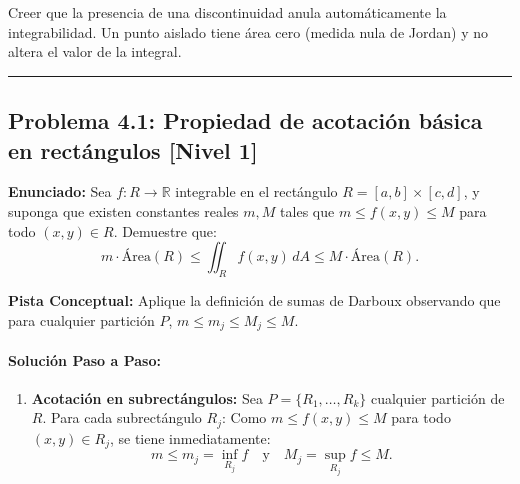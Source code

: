 \documentclass[11pt,a4paper]{article}
\begin{document}
\begin{trapbox}
Creer que la presencia de una discontinuidad anula automáticamente la integrabilidad. Un punto aislado tiene área cero (medida nula de Jordan) y no altera el valor de la integral.
\end{trapbox}

\vspace{0.5cm}
\hrule
\vspace{0.5cm}


\subsection*{Problema 4.1: Propiedad de acotación básica en rectángulos \hfill \color{primaryblue}\small[Nivel 1]}

\begin{tcolorbox}[colback=white,colframe=gray!40,arc=1mm,boxrule=0.5pt,left=3mm,right=3mm,top=2mm,bottom=2mm]
\textbf{Enunciado:} Sea $f: R \to \mathbb{R}$ integrable en el rectángulo $R = [a,b] \times [c,d]$, y suponga que existen constantes reales $m, M$ tales que $m \le f(x,y) \le M$ para todo $(x,y) \in R$. Demuestre que:
\begin{equation*}
m \cdot \text{Área}(R) \le \iint_R f(x,y) \, dA \le M \cdot \text{Área}(R).
\end{equation*}
\end{tcolorbox}

\begin{tcolorbox}[colback=yellow!4,colframe=accentamber!70,arc=1mm,boxrule=0.5pt,left=3mm,right=3mm,top=1.5mm,bottom=1.5mm]
\textbf{Pista Conceptual:} Aplique la definición de sumas de Darboux observando que para cualquier partición $P$, $m \le m_j \le M_j \le M$.
\end{tcolorbox}

\paragraph{Solución Paso a Paso:}\par
\begin{enumerate}[label=\textbf{\arabic*.}]
\item \textbf{Acotación en subrectángulos:}
Sea $P = \{R_1, \dots, R_k\}$ cualquier partición de $R$. Para cada subrectángulo $R_j$:
Como $m \le f(x,y) \le M$ para todo $(x,y) \in R_j$, se tiene inmediatamente:
\begin{equation*}
m \le m_j = \inf_{R_j} f \quad \text{y} \quad M_j = \sup_{R_j} f \le M.
\end{equation*}
\end{enumerate}
\end{document}
